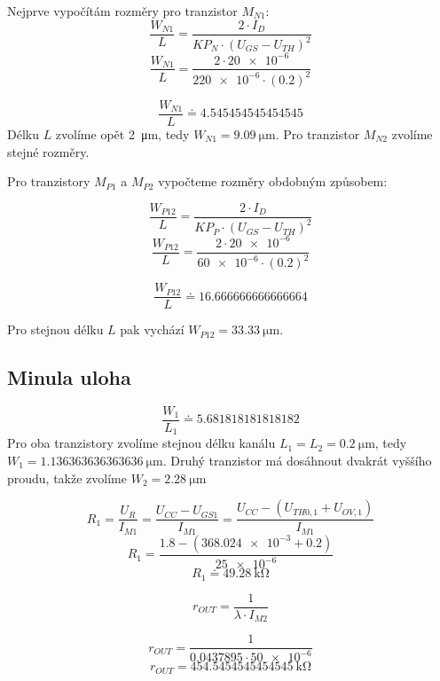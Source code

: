 Nejprve vypočítám rozměry pro tranzistor \(M_{N1} \):
\[
    \frac{W_{N1} }{L}=\frac{2\cdot I_{D}}{KP_{N}\cdot (U_{GS} -U_{TH})^2 } 
\]
\[
    \frac{W_{N1} }{L}=\frac{2\cdot \num{20e-6}}{\num{220e-6}\cdot (\num{0.2})^2 } 
\]

\[
    \frac{W_{N1} }{L}\doteq \num[round-mode=places,round-precision=2]{4.545454545454545} 
\]
Délku \(L\) zvolíme opět \qty{2}{\micro\meter}, tedy \(W_{N1}= \qty{9.09}{\micro\meter}\). Pro tranzistor \(M_{N2} \) zvolíme stejné rozměry.

Pro tranzistory \(M_{P1} \) a \(M_{P2} \) vypočteme rozměry obdobným způsobem:

\[
    \frac{W_{P12} }{L}=\frac{2\cdot I_{D}}{KP_{P}\cdot (U_{GS} -U_{TH})^2 } 
\]
\[
    \frac{W_{P12} }{L}=\frac{2\cdot \num{20e-6}}{\num{60e-6}\cdot (\num{0.2})^2 } 
\]

\[
    \frac{W_{P12} }{L}\doteq \num[round-mode=places,round-precision=2]{16.666666666666664}
\]

Pro stejnou délku \(L\) pak vychází \(W_{P12}=\qty{33.33}{\micro\meter} \).













\subsection{Minula uloha}

\[
    \frac{W_{1} }{L_{1} }\doteq \num[round-mode=places,round-precision=2]{5.681818181818182} 
\]
Pro oba tranzistory zvolíme stejnou délku kanálu \(L_{1}=L_{2} = \qty{0.2}{\micro\meter}\), tedy \(W_{1} =\qty[round-mode=places,round-precision=2]{1,136363636363636}{\micro\meter}\). Druhý tranzistor má dosáhnout dvakrát vyššího proudu, takže zvolíme \(W_{2} =\qty{2.28}{\micro\meter}\)  

\[
    R_1=\frac{U_R}{I_{M 1}}=\frac{U_{C C}-U_{G S 1}}{I_{M 1}}=\frac{U_{C C}-\left(U_{T H 0,1}+U_{O V, 1}\right)}{I_{M 1}}
\]
\[
    R_1=\frac{\num{1.8}-\left(\num{368,024e-3}+\num{0.2}\right)}{\num{25e-6}}
\]
\[
    R_{1} \doteq \qty{49,28}{\kilo\ohm}
\]


\[
    r_{O U T}=\frac{1}{\lambda \cdot I_{M 2}}
\]

\[
    r_{O U T}=\frac{1}{\num[round-mode=places,round-precision=3]{0,0437895} \cdot \num{50e-6}}
\]
\[
    r_{O U T}=\qty[round-mode=places,round-precision=3]{454,5454545454545}{\kilo\ohm}
\]



